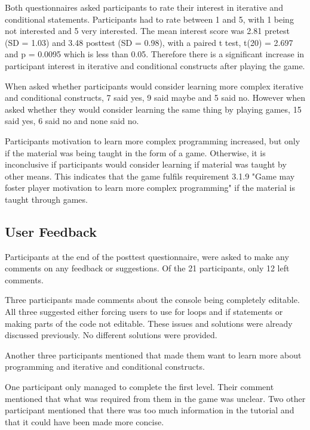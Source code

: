 \documentclass[a4paper,11.5pt]{report}
\numberwithin{figure}{section}
\numberwithin{table}{section}
\numberwithin{equation}{section}
\numberwithin{equation}{section}
\begin{document}
Both questionnaires asked participants to rate their interest in iterative and conditional statements. Participants had to rate between 1 and 5, with 1 being not interested and 5 very interested. The mean interest score was 2.81 pretest (SD = 1.03) and 3.48 posttest (SD = 0.98), with a paired t test, t(20) = 2.697 and p = 0.0095 which is less than 0.05. Therefore there is a significant increase in participant interest in iterative and conditional constructs after playing the game. 

When asked whether participants would consider learning more complex iterative and conditional constructs, 7 said yes, 9 said maybe and 5 said no. However when asked whether they would consider learning the same thing by playing games, 15 said yes, 6 said no and none said no. 

Participants motivation to learn more complex programming increased, but only if the material was being taught in the form of a game. Otherwise, it is inconclusive if participants would consider learning if material was taught by other means. This indicates that the game fulfils requirement 3.1.9 "Game may foster player motivation to learn more complex programming" if the material is taught through games. 





\subsection{User Feedback}


Participants at the end of the posttest questionnaire, were asked to make any comments on any feedback or suggestions. Of the 21 participants, only 12 left comments. 

Three participants made comments about the console being completely editable. All three suggested either forcing users to use for loops and if statements or making parts of the code not editable. These issues and solutions were already discussed previously. No different solutions were provided. 

Another three participants mentioned that made them want to learn more about programming and iterative and conditional constructs. 

One participant only managed to complete the first level. Their comment mentioned that what was required from them in the game was unclear. Two other participant mentioned that there was too much information in the tutorial and that it could have been made more concise. 
\end{document}
